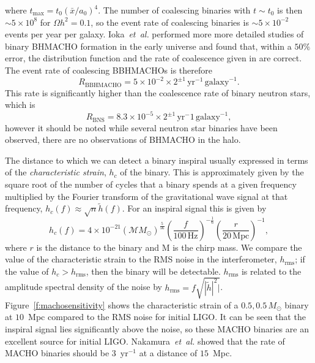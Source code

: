 where $t_\mathrm{max} = t_0(\bar{x}/a_0)^4$. The number of coalescing
binaries with $t \sim t_0$ is then $\sim 5 \times 10^{8}$ for $\Omega h^2 =
0.1$, so the event rate of coalescing binaries is $\sim 5 \times 10^{-2}$
events per year per galaxy. Ioka~\emph{et~al.} performed more more detailed
studies of binary BHMACHO formation in the early universe\cite{Ioka:1998nz}
and found that, within a $50\%$ error, the distribution function and the rate
of coalescence given in \cite{Nakamura:1997sm} are correct. The event rate of
coalescing BBHMACHOs is therefore
\begin{equation}
R_\mathrm{BBHMACHO} = 5\times 10^{-2}\times 2^{\pm
1}\,\mathrm{yr}^{-1}\,\mathrm{galaxy}^{-1}.
\end{equation}
This rate is significantly higher than the coalescence rate of
binary neutron stars, which is\cite{Kalogera:2004tn}
\begin{equation}
R_\mathrm{BNS} = 8.3\times 10^{-5}\times 2^{\pm
1}\,\mathrm{yr}^-1\,\mathrm{galaxy}^{-1},
\end{equation}
however it should be noted while several neutron star binaries have been
observed, there are no observations of BHMACHO in the halo.

The distance to which we can detect a binary inspiral usually expressed in
terms of the \emph{characteristic strain}, $h_c$ of the binary. This is
approximately given by the square root of the number of cycles that a binary
spends at a given frequency multiplied by the Fourier transform of the
gravitational wave signal at that frequency, $h_c(f) \approx \sqrt{n}
\tilde{h}(f)$.  For an inspiral signal this is given by\cite{Thorne:1982cv}
\begin{equation}
h_c(f)  =  4 \times 10^{-21} \left(\mathcal{M}{M_\odot}\right)^\frac{5}{56}
\left(\frac{f}{100\,\mathrm{Hz}}\right)^{-\frac{1}{6}} \left(\frac{r}{20\,
\mathrm{Mpc}}\right)^{-1},
\end{equation}
where $r$ is the distance to the binary and $\mathrm{M}$ is the chirp mass.
We compare the value of the characteristic strain to the RMS noise in the
interferometer, $h_\mathrm{rms}$; if the value of $h_c > h_\mathrm{rms}$,
then the binary will be detectable. $h_\mathrm{rms}$ is related to the
amplitude spectral density of the noise by $h_\mathrm{rms} = f
\sqrt{|\tilde{h}|^2|}$. Figure~\ref{f:machosensitivity} shows the
characteristic strain of a $0.5, 0.5\,M_\odot$ binary at $10$~Mpc compared to
the RMS noise for initial LIGO. It can be seen that the inspiral signal lies
significantly above the noise, so these MACHO binaries are an excellent source
for initial LIGO. Nakamura~\emph{et~al.} showed that the rate of MACHO
binaries should be $3$~yr$^{-1}$ at a distance of $15$~Mpc.

